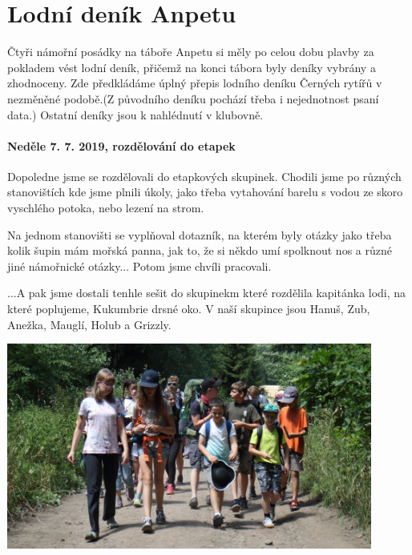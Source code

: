 \chapter{Lodní deník Anpetu} %
\label{cha:lodní_deník_etapkové_skupiny_černí_rytíři_anpetu_}

Čtyři námořní posádky na táboře Anpetu si měly po celou dobu plavby za pokladem vést lodní deník, přičemž na konci tábora byly deníky vybrány a zhodnoceny. Zde předkládáme úplný přepis lodního deníku Černých rytířů v nezměněné podobě.(Z původního deníku pochází třeba i nejednotnost psaní data.) Ostatní deníky jsou k nahlédnutí v klubovně.


\label{sub:lodní_deník_etapkové_skupiny_černí_rytíři}


\subsubsection{Neděle 7. 7. 2019, rozdělování do etapek} %
\label{ssub:rozdělování_do_etapek}

Dopoledne jsme se rozdělovali do etapkových skupinek. Chodili jsme po různých stanovištích kde jsme plnili úkoly, jako třeba vytahování barelu s vodou ze skoro vyschlého potoka, nebo lezení na strom.

Na jednom stanovišti se vyplňoval dotazník, na kterém byly otázky jako třeba kolik šupin mám mořská panna, jak to, že si někdo umí spolknout nos a různé jiné námořnické otázky...
Potom jsme chvíli pracovali.

...A pak jsme dostali tenhle sešit do skupinekm které rozdělila kapitánka lodi, na které poplujeme, Kukumbrie drsné oko. V naší skupince jsou Hanuš, Zub, Anežka, Mauglí, Holub a Grizzly.


\begin{center}
	\includegraphics[width=12cm]{img/anpetu_tabor/prichod.JPG}
\end{center}


